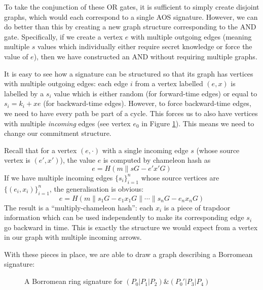 \documentclass[letterpaper]{article}
\begin{document}
To take the conjunction of these OR gates, it is sufficient to simply create
disjoint graphs, which would each correspond to a single AOS signature. However,
we can do better than this by creating a new graph structure corresponding to
the AND gate. Specifically, if we create a vertex $e$ with multiple outgoing edges
(meaning multiple $s$ values which individually either require secret knowledge
or force the value of $e$), then we have constructed an AND without requiring
multiple graphs.

It is easy to see how a signature can be structured so that its graph has
vertices with multiple outgoing edges: each edge $i$ from a vertex labelled
$(e,x)$ is labelled by a $s_i$ value which is either random (for forward-time
edges) or equal to $s_i = k_i + xe$ (for backward-time edges). However, to
force backward-time edges, we need to have every path be part of a cycle. This
forces us to also have vertices with multiple \emph{incoming} edges (see vertex
$e_0$ in Figure \ref{fig2}). This means we need to change our commitment structure.

Recall that for a vertex $(e,\cdot)$ with a single incoming edge $s$ (whose source
vertex is $(e',x')$), the value $e$ is computed by chameleon hash as
\[ e = H(m\| sG - e'x'G) \]
If we have multiple incoming edges $\{s_i\}_{i=1}^n$ whose source vertices are
$\{(e_i,x_i)\}_{i=1}^n$, the generalisation is obvious:
\[ e = H(m\| s_1G - e_1x_1G \| \cdots \| s_nG - e_nx_nG) \]
The result is a ``multiply-chameleon hash'': each $x_i$ is a piece of trapdoor
information which can be used independently to make its corresponding edge $s_i$
go backward in time. This is exactly the structure we would expect from a vertex
in our graph with multiple incoming arrows.
\clearpage

With these pieces in place, we are able to draw a graph describing a Borromean
signature:
\begin{figure}[H]
\begin{center}
\end{center}
\caption{A Borromean ring signature for $(P_0 | P_1 | P_2) \& (P_0' | P_3 | P_4)$\label{fig2}}
\end{figure}
\end{document}
